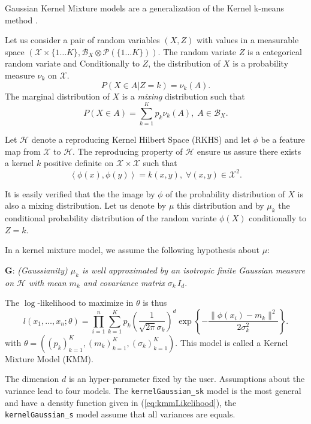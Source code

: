 \documentclass[shortnames,nojss,article]{jss}
\newcommand{\X}{{\mathcal{X}}}
\newcommand{\scalprod}[2]{\left\langle#1,#2\right\rangle}
\begin{document}
Gaussian Kernel Mixture models are a generalization of the Kernel k-means method
\cite{ShaweTaylor2004}.

Let us consider a pair of random variables $(X,Z)$ with values in a measurable space
$(\mathcal{X}\times\{1\ldots K\},\mathcal{B}_X\otimes\mathcal{P}(\{1...K\}))$.
The random variate $Z$ is a categorical random variate and Conditionally to
$Z$, the distribution of $X$ is a probability measure $\nu_k$ on $\mathcal{X}$.
\begin{equation*}
P(X\in A| Z=k) = \nu_k(A).
\end{equation*}
The marginal distribution of $X$ is a \emph{mixing} distribution such that
\begin{equation*}
P(X\in A) = \sum_{k=1}^K p_k \nu_k(A),\; A\in \mathcal{B}_X.
\end{equation*}


Let $\mathcal{H}$ denote a reproducing Kernel Hilbert Space (RKHS) and let
$\phi$ be a feature map from $\mathcal{X}$ to $\mathcal{H}$. The reproducing
property of $\mathcal{H}$ ensure us assure there exists a kernel $k$ positive definite
on $\X\times\X$ such that
\begin{equation*}
\scalprod{\phi(x)}{\phi(y)} = k(x,y),\; \forall (x,y)\in\X^2.
\end{equation*}

It is easily verified that the the image by $\phi$ of the probability distribution of $X$
is also a mixing distribution. Let us denote by $\mu$ this distribution and by
$\mu_k$ the conditional probability distribution of the random variate $\phi(X)$
conditionally to $Z=k$.

In a kernel mixture model, we assume the following hypothesis about $\mu$:

\noindent\textbf{G}: \textit{(Gaussianity) $\mu_k$ is well approximated by an
isotropic finite Gaussian measure on $\mathcal{H}$ with mean $m_k$ and
covariance matrix $\sigma_k\, I_{d}$}.

The $\log$-likelihood to maximize in $\theta$ is thus
\begin{equation}
\label{eq:kmmLikelihood}
l(x_1,\ldots,x_n;\theta) = \prod_{i=1}^n
\sum_{k=1}^K p_k \left(\frac{1}{\sqrt{2\pi}\sigma_k}\right)^{d}
\exp\left\{-\frac{\|\phi(x_i)-m_k\|^2}{2\sigma_k^2} \right\}.
\end{equation}
with $\theta=\left((p_k)_{k=1}^K,(m_k)_{k=1}^K,(\sigma_k)_{k=1}^K\right)$.
This model is called a Kernel Mixture Model (KMM).

The dimension $d$ is an hyper-parameter fixed by the user. Assumptions about the
variance lead to four models. The \verb+kernelGaussian_sk+ model is the most general
and have a density function given in (\ref{eq:kmmLikelihood}), the
\verb+kernelGaussian_s+ model assume that all variances are equals.
\end{document}
